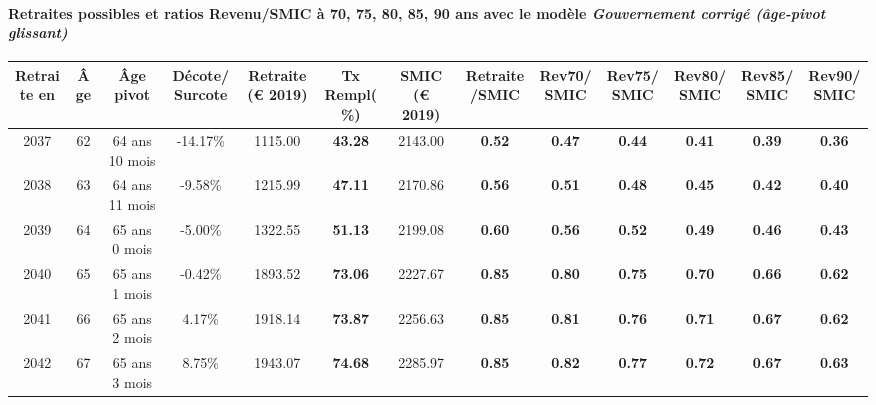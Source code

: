\paragraph{Retraites possibles et ratios Revenu/SMIC à 70, 75, 80, 85, 90 ans avec le modèle \emph{Gouvernement corrigé (âge-pivot glissant)}}  
 
{ \scriptsize \begin{center} 
\begin{tabular}[htb]{|c|c||c|c||c|c||c||c|c|c|c|c|c|} 
\hline 
 Retraite en &  Âge &  Âge pivot &  Décote/Surcote &  Retraite (\euro{} 2019) &  Tx Rempl(\%) &  SMIC (\euro{} 2019) &  Retraite/SMIC &  Rev70/SMIC &  Rev75/SMIC &  Rev80/SMIC &  Rev85/SMIC &  Rev90/SMIC \\ 
\hline \hline 
 2037 &  62 &  64 ans 10 mois &  -14.17\% &  1115.00 &  {\bf 43.28} &  2143.00 &  {\bf {\color{red} 0.52}} &  {\bf {\color{red} 0.47}} &  {\bf {\color{red} 0.44}} &  {\bf {\color{red} 0.41}} &  {\bf {\color{red} 0.39}} &  {\bf {\color{red} 0.36}} \\ 
\hline 
 2038 &  63 &  64 ans 11 mois &  -9.58\% &  1215.99 &  {\bf 47.11} &  2170.86 &  {\bf {\color{red} 0.56}} &  {\bf {\color{red} 0.51}} &  {\bf {\color{red} 0.48}} &  {\bf {\color{red} 0.45}} &  {\bf {\color{red} 0.42}} &  {\bf {\color{red} 0.40}} \\ 
\hline 
 2039 &  64 &  65 ans 0 mois &  -5.00\% &  1322.55 &  {\bf 51.13} &  2199.08 &  {\bf {\color{red} 0.60}} &  {\bf {\color{red} 0.56}} &  {\bf {\color{red} 0.52}} &  {\bf {\color{red} 0.49}} &  {\bf {\color{red} 0.46}} &  {\bf {\color{red} 0.43}} \\ 
\hline 
 2040 &  65 &  65 ans 1 mois &  -0.42\% &  1893.52 &  {\bf 73.06} &  2227.67 &  {\bf {\color{red} 0.85}} &  {\bf {\color{red} 0.80}} &  {\bf {\color{red} 0.75}} &  {\bf {\color{red} 0.70}} &  {\bf {\color{red} 0.66}} &  {\bf {\color{red} 0.62}} \\ 
\hline 
 2041 &  66 &  65 ans 2 mois &  4.17\% &  1918.14 &  {\bf 73.87} &  2256.63 &  {\bf {\color{red} 0.85}} &  {\bf {\color{red} 0.81}} &  {\bf {\color{red} 0.76}} &  {\bf {\color{red} 0.71}} &  {\bf {\color{red} 0.67}} &  {\bf {\color{red} 0.62}} \\ 
\hline 
 2042 &  67 &  65 ans 3 mois &  8.75\% &  1943.07 &  {\bf 74.68} &  2285.97 &  {\bf {\color{red} 0.85}} &  {\bf {\color{red} 0.82}} &  {\bf {\color{red} 0.77}} &  {\bf {\color{red} 0.72}} &  {\bf {\color{red} 0.67}} &  {\bf {\color{red} 0.63}} \\ 
\hline 
\hline 
\end{tabular} 
\end{center} } 
